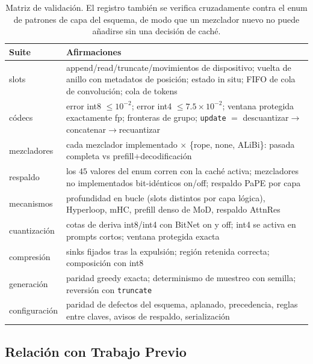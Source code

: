 \begin{table}[H]
\centering
\small
\begin{tabularx}{0.98\linewidth}{l X}
\toprule
\textbf{Suite} & \textbf{Afirmaciones} \\
\midrule
slots & append/read/truncate/movimientos de dispositivo; vuelta de anillo con metadatos de posición; estado in situ; FIFO de cola de convolución; cola de tokens \\
códecs & error int8 $\le 10^{-2}$; error int4 $\le 7.5\times10^{-2}$; ventana protegida exactamente fp; fronteras de grupo; \texttt{update} $=$ descuantizar$\to$concatenar$\to$recuantizar \\
mezcladores & cada mezclador implementado $\times$ \{rope, none, ALiBi\}: pasada completa vs prefill+decodificación \\
respaldo & los $45$ valores del enum corren con la caché activa; mezcladores no implementados bit-idénticos on/off; respaldo PaPE por capa \\
mecanismos & profundidad en bucle (slots distintos por capa lógica), Hyperloop, mHC, prefill denso de MoD, respaldo AttnRes \\
cuantización & cotas de deriva int8/int4 con BitNet on y off; int4 se activa en prompts cortos; ventana protegida exacta \\
compresión & sinks fijados tras la expulsión; región retenida correcta; composición con int8 \\
generación & paridad greedy exacta; determinismo de muestreo con semilla; reversión con \texttt{truncate} \\
configuración & paridad de defectos del esquema, aplanado, precedencia, reglas entre claves, avisos de respaldo, serialización \\
\bottomrule
\end{tabularx}
\caption{Matriz de validación. El registro también se verifica cruzadamente contra el enum de patrones de capa del esquema, de modo que un mezclador nuevo no puede añadirse sin una decisión de caché.}
\label{tab:kv-tests}
\end{table}

\subsection{Relación con Trabajo Previo}

